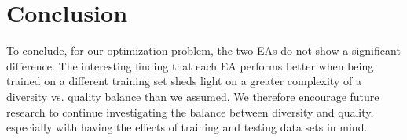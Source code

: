\section{Conclusion}

To conclude, for our optimization problem, the two EAs do not show a significant difference. The interesting finding that each EA performs better when being trained on a different training set sheds light on a greater complexity of a diversity vs. quality balance than we assumed. We therefore encourage future research to continue investigating the balance between diversity and quality, especially with having the effects of training and testing data sets in mind.
